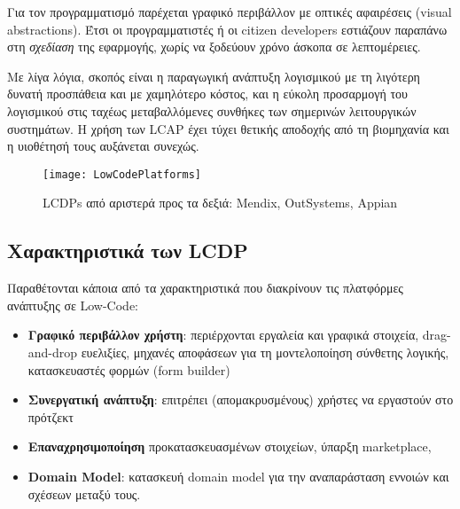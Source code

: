         Για τον προγραμματισμό παρέχεται γραφικό περιβάλλον με οπτικές αφαιρέσεις (visual abstractions). Έτσι οι προγραμματιστές ή οι citizen developers εστιάζουν παραπάνω στη \textit{σχεδίαση} της εφαρμογής, χωρίς να ξοδεύουν χρόνο άσκοπα σε λεπτομέρειες.

        Με λίγα λόγια, σκοπός είναι η παραγωγική ανάπτυξη λογισμικού με τη λιγότερη δυνατή προσπάθεια και με χαμηλότερο κόστος, και η εύκολη προσαρμογή του λογισμικού στις ταχέως μεταβαλλόμενες συνθήκες των σημερινών λειτουργικών συστημάτων. Η χρήση των LCAP έχει τύχει θετικής αποδοχής από τη βιομηχανία και η υιοθέτησή τους αυξάνεται συνεχώς. \cite{Bock2021,Bucaioni2022,Sahay2020}



        \begin{figure}[H] \noindent \centering
                \texttt{[image: LowCodePlatforms]}
                \caption{LCDPs από αριστερά προς τα δεξιά: Mendix, OutSystems, Appian \cite{LowCodeMendix}}
        \end{figure}

        \subsection{Χαρακτηριστικά των LCDP}
            Παραθέτονται κάποια από τα χαρακτηριστικά που διακρίνουν τις πλατφόρμες ανάπτυξης σε Low-Code:

            \vspace{-0.5em}
            \begin{itemize}[label={\tiny \blacksquare}]
                \setlength\itemsep{-0.25em}
                \item \textbf{Γραφικό περιβάλλον χρήστη}: περιέρχονται εργαλεία και γραφικά στοιχεία, drag-and-drop ευελιξίες, μηχανές αποφάσεων για τη μοντελοποίηση σύνθετης λογικής, κατασκευαστές φορμών (form builder)
                \item \textbf{Συνεργατική ανάπτυξη}: επιτρέπει (απομακρυσμένους) χρήστες να εργαστούν στο πρότζεκτ
                \item \textbf{Επαναχρησιμοποίηση} προκατασκευασμένων στοιχείων, ύπαρξη marketplace,
                \item \textbf{Domain Model}: κατασκευή domain model για την αναπαράσταση εννοιών και σχέσεων μεταξύ τους. \cite{MDELow}
            \end{itemize}
            \vspace{-0.5em}

